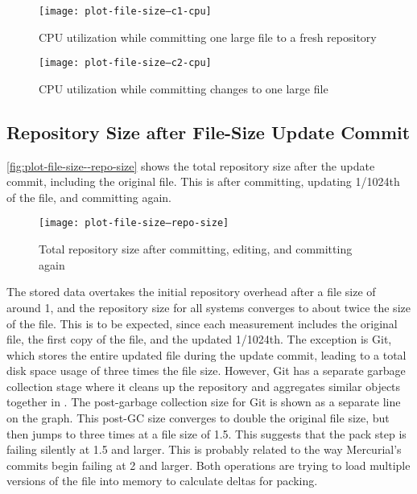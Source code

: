 \begin{figure}[]
  \caption{CPU utilization while committing one large file to a fresh repository}
  \label{fig:plot-file-size--c1-cpu}
  \centering
    \texttt{[image: plot-file-size--c1-cpu]}
\end{figure}


\begin{figure}[]
  \caption{CPU utilization while committing changes to one large file}
  \label{fig:plot-file-size--c2-cpu}
  \centering
    \texttt{[image: plot-file-size--c2-cpu]}
\end{figure}

%


\subsection{Repository Size after File-Size Update Commit}

\autoref{fig:plot-file-size--repo-size} shows the total repository size after
the update commit, including the original file. This is after committing,
updating \num{1/1024}th of the file, and committing again.

\begin{figure}[]
  \caption{Total repository size after committing, editing, and committing again}
  \label{fig:plot-file-size--repo-size}
  \centering
    \texttt{[image: plot-file-size--repo-size]}
\end{figure}

The stored data overtakes the initial repository overhead after a file size of
around \SI{1}{\mib}, and the repository size for all systems converges to about
twice the size of the file. This is to be expected, since each measurement
includes the original file, the first copy of the file, and the updated
\num{1/1024}th. The exception is Git, which stores the entire updated file
during the update commit, leading to a total disk space usage of three times the
file size. However, Git has a separate garbage collection stage where it cleans
up the repository and aggregates similar objects together in . The post-garbage collection size for Git is shown as a separate line on
the graph. This post-GC size converges to double the original file size, but
then jumps to three times at a file size of \SI{1.5}{\gib}. This suggests that
the pack step is failing silently at \SI{1.5}{\gib} and larger. This is probably
related to the way Mercurial's commits begin failing at \SI{2}{\gib} and larger.
Both operations are trying to load multiple versions of the file into memory to
calculate deltas for packing.

